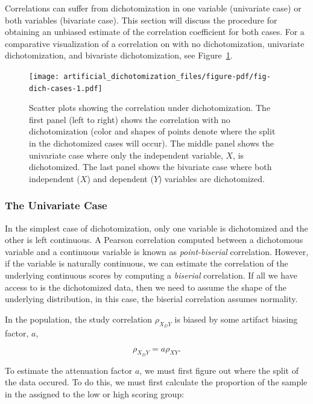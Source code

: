 \documentclass[
  letterpaper,
  DIV=11,
  numbers=noendperiod]{scrreprt}
\begin{document}
Correlations can suffer from dichotomization in one variable (univariate
case) or both variables (bivariate case). This section will discuss the
procedure for obtaining an unbiased estimate of the correlation
coefficient for both cases. For a comparative visualization of a
correlation on with no dichotomization, univariate dichotomization, and
bivariate dichotomization, see Figure~\ref{fig-dich-cases}.

\begin{figure}[H]

{\centering \texttt{[image: artificial\_dichotomization\_files/figure-pdf/fig-dich-cases-1.pdf]}

}

\caption{\label{fig-dich-cases}Scatter plots showing the correlation
under dichotomization. The first panel (left to right) shows the
correlation with no dichotomization (color and shapes of points denote
where the split in the dichotomized cases will occur). The middle panel
shows the univariate case where only the independent variable, \(X\), is
dichotomized. The last panel shows the bivariate case where both
independent (\(X\)) and dependent (\(Y\)) variables are dichotomized.}

\end{figure}

\hypertarget{the-univariate-case}{%
\subsubsection*{The Univariate Case}\label{the-univariate-case}}

In the simplest case of dichotomization, only one variable is
dichotomized and the other is left continuous. A Pearson correlation
computed between a dichotomous variable and a continuous variable is
known as \emph{point-biserial} correlation. However, if the variable is
naturally continuous, we can estimate the correlation of the underlying
continuous scores by computing a \emph{biserial} correlation. If all we
have access to is the dichotomized data, then we need to assume the
shape of the underlying distribution, in this case, the biserial
correlation assumes normality.

In the population, the study correlation \(\rho_{X_D Y}\) is biased by
some artifact biasing factor, \(a\),

\[
\rho_{X_D Y} = a\rho_{XY}.
\]

To estimate the attenuation factor \(a\), we must first figure out where
the split of the data occured. To do this, we must first calculate the
proportion of the sample in the assigned to the low or high scoring
group:
\end{document}

